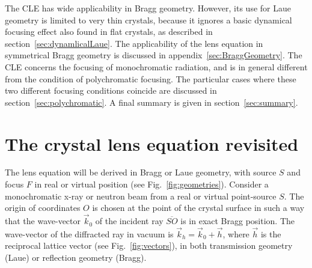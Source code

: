 \documentclass[preprint]{iucr}              %
\begin{document}
The CLE has wide applicability in Bragg geometry. However, its use for Laue geometry is limited to very thin crystals, because
it ignores a basic dynamical focusing effect also found in flat crystals,
as described in section~\ref{sec:dynamlicalLaue}. 
The applicability of the lens equation in symmetrical Bragg geometry is discussed in appendix~\ref{sec:BraggGeometry}.
The CLE concerns the focusing of monochromatic radiation, and is in general different from the condition of polychromatic focusing. The particular cases where these two different focusing conditions coincide are discussed in section~\ref{sec:polychromatic}. A final summary is given in section~\ref{sec:summary}.   


\section{The crystal lens equation revisited}
\label{sec:CLE}

The lens equation will be derived in Bragg or Laue geometry, with source $S$ and focus $F$ in real or virtual position (see Fig.~\ref{fig:geometries}). Consider a monochromatic x-ray or neutron beam from a real or virtual point-source $S$. The origin of coordinates $O$ is chosen at the point of the crystal surface in such a way that the wave-vector  ${\vec k_0}$ of the incident ray $\overline{SO}$ is in exact Bragg  position. The wave-vector of the diffracted ray in vacuum is
$\vec k_h = \vec k_0 + \vec h$, where $\vec h$ is the reciprocal lattice vector (see Fig.~\ref{fig:vectors}),
in both transmission geometry (Laue) or reflection geometry (Bragg).
\end{document}

